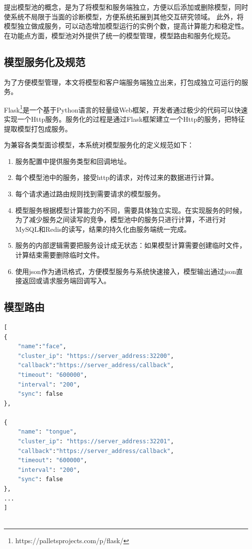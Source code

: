 提出模型池的概念，是为了将模型和服务端独立，方便以后添加或删除模型，同时使系统不局限于当面的诊断模型，方便系统拓展到其他交互研究领域。
此外，将模型独立做成服务，可以动态增加模型运行的实例个数，提高计算能力和稳定性。
在功能点方面，模型池对外提供了统一的模型管理，模型路由和服务化规范。

\subsection{模型服务化及规范}
为了方便模型管理，本文将模型和客户端服务端独立出来，打包成独立可运行的服务。

Flask\footnote{https://palletsprojects.com/p/flask/}是一个基于Python语言的轻量级Web框架，开发者通过极少的代码可以快速实现一个Http服务。服务化的过程是通过Flask框架建立一个Http的服务，把特征提取模型打包成服务。

为兼容各类型面诊模型，本系统对模型服务化的定义规范如下：
\begin{enumerate}
 

    \item 服务配置中提供服务类型和回调地址。

    \item 每个模型池中的服务，接受http的请求，对传过来的数据进行计算。

    \item 每个请求通过路由规则找到需要请求的模型服务。

    \item 模型服务根据模型计算能力的不同，需要具体独立实现。在实现服务的时候，为了减少服务之间读写的竞争，模型池中的服务只进行计算，不进行对MySQL和Redis的读写，结果的持久化由服务端统一完成。

    \item 服务的内部逻辑需要把服务设计成无状态：如果模型计算需要创建临时文件，计算结束需要删除临时文件。

    \item 使用json作为通讯格式，方便模型服务与系统快速接入，模型输出通过json直接返回或请求服务端回调写入。
\end{enumerate}

\subsection{模型路由}

\begin{lstlisting}[language={Python}, title=services.json]
[
{
    "name":"face",
    "cluster_ip": "https://server_address:32200",
    "callback":"https://server_address/callback",
    "timeout": "600000",
    "interval": "200",
    "sync": false
}, 

{
    "name": "tongue",
    "cluster_ip": "https://server_address:32201",
    "callback":"https://server_address/callback",
    "timeout": "600000",
    "interval": "200",
    "sync": false
},
...
]
    
\end{lstlisting}

